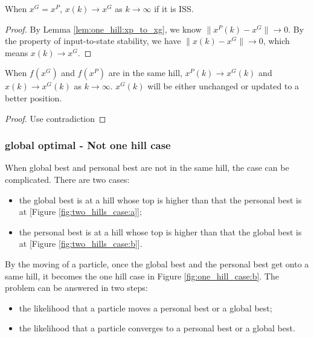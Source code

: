 \begin{lemma}
When $  x^{G} = x^{P} $, $ x(k) \rightarrow x^{G} $ as $ k \rightarrow \infty $ if it is ISS.
\begin{proof}
By Lemma \ref{lem:one_hill:xp_to_xg}, we know $ \lVert x^{P}(k) - x^{G} \rVert \rightarrow 0 $.
By the property of input-to-state stability, we have $ \lVert x(k) - x^{G} \rVert \rightarrow 0 $, which means
$ x(k) \rightarrow x^{G} $.
\end{proof}
\end{lemma}

\begin{theorem}
When $ f(x^{G}) $ and $ f(x^{P}) $ are in the same hill, $ x^{P}(k) \rightarrow x^{G}(k) $ and $ x(k) \rightarrow x^{G}(k) $ as $ k \rightarrow \infty $.
$ x^{G}(k) $ will be either unchanged or updated to a better position.
\begin{proof}
Use contradiction
\end{proof}
\end{theorem}

\subsubsection{global optimal - Not one hill case}

When global best and personal best are not in the same hill, the case can be complicated.
There are two cases:
\begin{itemize}
\item the global best is at a hill whose top is higher than that the personal best is at [Figure \ref{fig:two_hills_case:a}];
\item the personal best is at a hill whose top is higher than that the global best is at [Figure \ref{fig:two_hills_case:b}]. 
\end{itemize}
By the moving of a particle, once the global best and the personal best get onto a same hill, it becomes the one hill case in Figure \ref{fig:one_hill_case:b}.
The problem can be answered in two steps:
\begin{itemize}
\item the likelihood that a particle moves a personal best or a global best;
\item the likelihood that a particle converges to a personal best or a global best.
\end{itemize}

